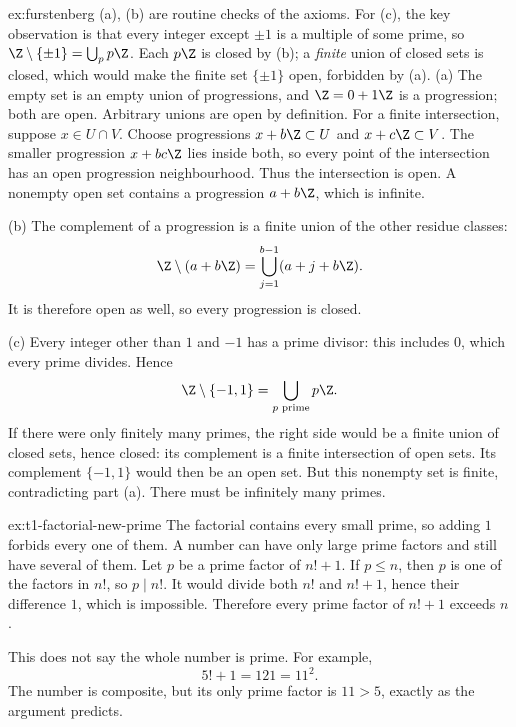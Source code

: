 \begin{solution}{ex:furstenberg}
\idea (a), (b) are routine checks of the axioms. For (c), the key observation is that every integer except $\pm1$ is a multiple of some prime, so $\Z\setminus\{\pm1\}=\bigcup_pp\Z$. Each $p\Z$ is closed by (b); a \emph{finite} union of closed sets is closed, which would make the finite set $\{\pm1\}$ open, forbidden by (a).
\writeup (a) The empty set is an empty union of progressions, and $\Z=0+1\Z$ is a progression; both are open. Arbitrary unions are open by definition. For a finite intersection, suppose $x\in U\cap V$. Choose progressions $x+b\Z\subset U$ and $x+c\Z\subset V$. The smaller progression $x+bc\Z$ lies inside both, so every point of the intersection has an open progression neighbourhood. Thus the intersection is open. A nonempty open set contains a progression $a+b\Z$, which is infinite.

(b) The complement of a progression is a finite union of the other residue classes:
\[
\Z\setminus(a+b\Z)=\bigcup_{j=1}^{b-1}(a+j+b\Z).
\]
It is therefore open as well, so every progression is closed.

(c) Every integer other than $1$ and $-1$ has a prime divisor: this includes $0$, which every prime divides. Hence
\[
\Z\setminus\{-1,1\}=\bigcup_{\text{$p$ prime}}p\Z.
\]
If there were only finitely many primes, the right side would be a finite union of closed sets, hence closed: its complement is a finite intersection of open sets. Its complement $\{-1,1\}$ would then be an open set. But this nonempty set is finite, contradicting part (a). There must be infinitely many primes.
\end{solution}

\begin{solution}{ex:t1-factorial-new-prime}
\idea The factorial contains every small prime, so adding $1$ forbids every one of them. A number can have only large prime factors and still have several of them.
\writeup Let $p$ be a prime factor of $n!+1$. If $p\le n$, then $p$ is one of the factors in $n!$, so $p\mid n!$. It would divide both $n!$ and $n!+1$, hence their difference $1$, which is impossible. Therefore every prime factor of $n!+1$ exceeds $n$.

This does not say the whole number is prime. For example,
\[
5!+1=121=11^2.
\]
The number is composite, but its only prime factor is $11>5$, exactly as the argument predicts.
\end{solution}


